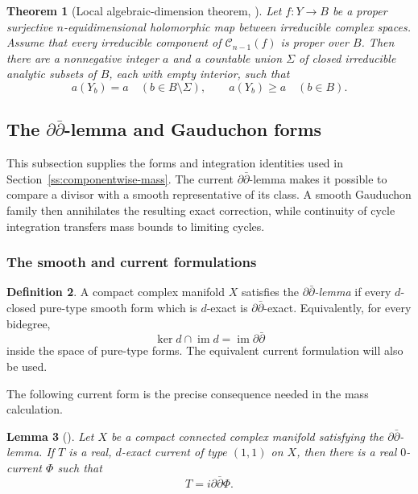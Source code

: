 \documentclass[11pt]{amsart}
\numberwithin{equation}{section}
\theoremstyle{plain}
\newtheorem{thm}{Theorem}[section]
\newtheorem{lemma}[thm]{Lemma}
\theoremstyle{definition}
\newtheorem{defn}[thm]{Definition}
\newcommand{\cC}{\mathcal C}
\begin{document}
\begin{thm}[Local algebraic-dimension theorem,
{\cite[Proposition~4.0.8]{Ba15}}]
\label{thm:revised-barlet-local}
Let $f:Y\to B$ be a proper surjective $n$-equidimensional holomorphic map
between irreducible complex spaces.  Assume that every irreducible
component of $\cC_{n-1}(f)$ is proper over $B$.  Then there are a
nonnegative integer $a$ and a countable union $\Sigma$ of closed
irreducible analytic subsets of $B$, each with empty interior, such that
\[
 a(Y_b)=a\quad(b\in B\setminus\Sigma),
 \qquad a(Y_b)\ge a\quad(b\in B).
\]
\end{thm}

\subsection{The \texorpdfstring{$\partial\bar\partial$}{ddbar}-lemma and Gauduchon forms}
\label{ss:revised-ddbar-locus}
\label{ss:revised-gauduchon-forms}

This subsection supplies the forms and integration identities used
in Section~\ref{ss:componentwise-mass}.  The current
$\partial\bar\partial$-lemma makes it possible to compare a divisor with
a smooth representative of its class.  A smooth Gauduchon family then
annihilates the resulting exact correction, while continuity of cycle
integration transfers mass bounds to limiting cycles.

\subsubsection{The smooth and current formulations}
\begin{defn}\label{def:revised-ddbar}
A compact complex manifold $X$ satisfies the
\emph{$\partial\bar\partial$-lemma} if every $d$-closed pure-type smooth form which
is $d$-exact is $\partial\bar\partial$-exact.  Equivalently, for every
bidegree,
\[
 \ker d\cap\operatorname{im}d
 =\operatorname{im}\partial\bar\partial
\]
inside the space of pure-type forms.  The equivalent current formulation
will also be used.
\end{defn}

The following current form is the precise consequence needed in the mass
calculation.

\begin{lemma}[{\cite[Lemma~5.0.12]{Ba15}}]\label{lem:revised-current-ddbar}
Let $X$ be a compact connected complex manifold satisfying the
$\partial\bar\partial$-lemma.  If $T$ is a real, $d$-exact current of type
$(1,1)$ on $X$, then there is a real $0$-current $\Phi$ such that
\begin{equation}\label{eq:revised-current-ddbar}
 T=i\partial\bar\partial\Phi.
\end{equation}
\end{lemma}
\end{document}
